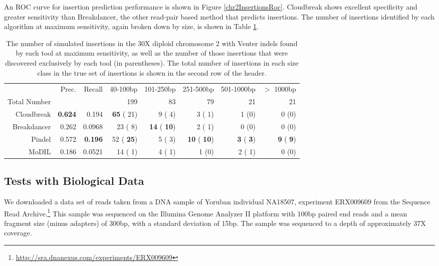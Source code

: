 \documentclass[11pt]{article}
\begin{document}
An ROC curve for insertion prediction performance is shown in Figure \ref{chr2InsertionsRoc}. Cloudbreak shows excellent specificity and greater sensitivity than Breakdancer, the other read-pair based method that predicts insertions. The number of insertions identified by each algorithm at maximum sensitivity, again broken down by size, is shown in Table \ref{chr2InsertionPreds}.

\begin{table}[t]
\begin{center}
\begin{tabular}{rrr|rrrrr}
  \hline
                        & Prec. & Recall & 40-100bp  & 101-250bp  & 251-500bp & 501-1000bp & $>$ 1000bp \\ 
 Total Number &          &           & 199 &  83 & 79 &  21 & 21\\ 
  \hline
  Cloudbreak   &\textbf{0.624} & 0.194  & \textbf{  65} (  21)  &    9 (   4) &     3 (   1) &    1 (0) & 0 (0) \\ 
  Breakdancer & 0.262 & 0.0968  &   23 (   8)  & \textbf{  14} (\textbf{  10}) &     2 (   1) & 0 (0) & 0 (0) \\ 
  Pindel          & 0.572 & \textbf{0.196} &   52 (\textbf{  25})  &    5 (   3) &  \textbf{  10} (\textbf{  10}) & \textbf{   3} (\textbf{   3}) & \textbf{   9} (\textbf{   9})\\ 
  MoDIL          & 0.186 & 0.0521 &   14 (   1)  &    4 (   1) &     1 (0) &    2 (   1) & 0 (0)\\ 
   \hline
\end{tabular}
\end{center}
\caption{The number of simulated insertions in the 30X diploid chromosome 2 with Venter indels found by each tool at maximum sensitivity, as well as the number of those insertions that were discovered exclusively by each tool (in parentheses). The total number of insertions in each size class in the true set of insertions is shown in the second row of the header.}
\label{chr2InsertionPreds}
\end{table}

\subsection{Tests with Biological Data}

We downloaded a data set of reads taken from a DNA sample of Yoruban individual NA18507, experiment ERX009609 from the Sequence Read Archive.\footnote{\url{http://sra.dnanexus.com/experiments/ERX009609}} This sample was sequenced on the Illumina Genome Analyzer II platform with 100bp paired end reads and a mean fragment size (minus adapters) of 300bp, with a standard deviation of 15bp. The sample was sequenced to a depth of approximately 37X coverage.
\end{document}
